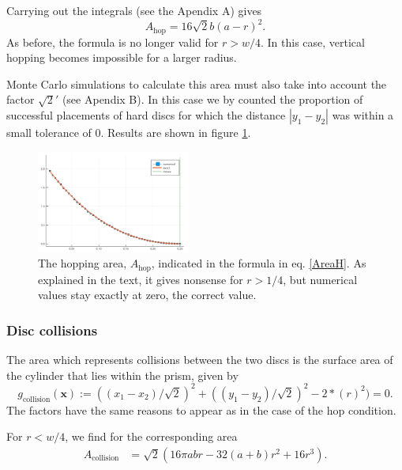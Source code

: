 \documentclass[superscriptaddress,pre,reprint,showpacs,onecolumn]{revtex4-1}
\begin{document}
Carrying out the integrals  (see the Apendix A) gives
 \begin{equation}\label{AreaH}
 A_\text{hop}  =  16 \sqrt{2} b(a-r)^2.
\end{equation}
As before, the formula is no longer valid for $r > w/4$. In this case,
vertical hopping becomes impossible for a larger radius.

Monte Carlo simulations to calculate this area must also
take into account the factor $\sqrt{2}'$ (see Apendix B).
In this case we 
by counted the proportion of successful placements of hard discs 
for which the distance 
$|y_1 - y_2|$ was within a small tolerance of $0$. 
Results are shown in figure \ref{AreaHopp01}.

\begin{figure}[h]
\centering
\includegraphics[width=0.45\textwidth]{./figures/AreaHop01.png}
\caption{The hopping area, $A_\text{hop}$, 
  indicated in the formula in eq. \ref{AreaH}. As explained
in the text, it gives nonsense for $r>1/4$, but numerical values stay
exactly at zero, the correct value. } 
\label{AreaHopp01}
\end{figure}


\subsubsection{Disc collisions}

The area which represents collisions between the two discs is the surface area of the cylinder
that lies within the prism, given by
$$g_\text{collision}(\mathbf{x}) := ((x_1-x_2)/\sqrt{2})^2 + ((y_1-y_2)/\sqrt{2})^2
- 2*(r)^2) = 0.$$
The factors have the same reasons to appear as in the case of the hop condition.

For $r<w/4$, we find for the corresponding area
\begin{align}\label{AreaChoque}
A_\text{collision} & =  \sqrt{2} (
16\pi a b r -32 (a+b)r^2 +16 r^3).
\end{align}
\end{document}
